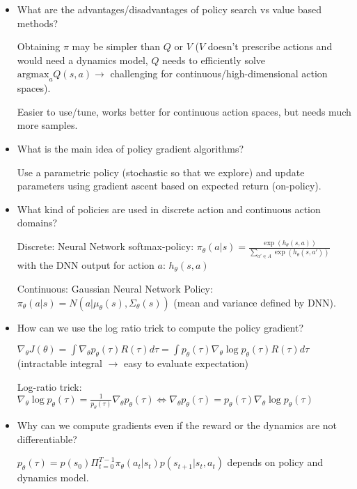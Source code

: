 \documentclass[11pt]{scrartcl}
\begin{document}
\begin{itemize}
    \item What are the advantages/disadvantages of policy search vs value based methods?

    Obtaining $\pi$ may be simpler than $Q$ or $V$ ($V$ doesn't prescribe actions and would 
    need a dynamics model, $Q$ needs to efficiently solve $\mathrm{argmax}_a Q(s,a) \rightarrow$
    challenging for continuous/high-dimensional action spaces).

    Easier to use/tune, works better for continuous action spaces, but needs much more samples.

    \item What is the main idea of policy gradient algorithms?
    
    Use a parametric policy (stochastic so that we explore) and update parameters using 
    gradient ascent based on expected return (on-policy).

    \item What kind of policies are used in discrete action and continuous action domains?
    
    Discrete: Neural Network softmax-policy: $\pi_\theta(a|s) = 
    \frac{\exp(h_\theta(s,a))}{\sum_{a' \in A} \exp(h_\theta(s,a'))}$ with the DNN output for 
    action $a$: $h_\theta(s,a)$

    Continuous: Gaussian Neural Network Policy: $\pi_\theta(a|s) = 
    N(a|\mu_\theta(s),\Sigma_\theta(s))$ (mean and variance defined by DNN).

    \item How can we use the log ratio trick to compute the policy gradient?
    
    $\nabla_\theta J(\theta) = \int \nabla_\theta p_\theta(\tau) R(\tau) d\tau = \int 
    p_\theta(\tau) \nabla_\theta \log p_\theta(\tau) R(\tau) d\tau$ 
    (intractable integral $\rightarrow$ easy to evaluate expectation)

    Log-ratio trick: $\nabla_\theta \log p_\theta(\tau) = \frac{1}{p_\theta(\tau)} \nabla_\theta p_\theta(\tau)
    \Leftrightarrow \nabla_\theta p_\theta(\tau) = p_\theta(\tau) \nabla_\theta \log p_\theta(\tau)$

    \item Why can we compute gradients even if the reward or the dynamics are not differentiable?

    $p_\theta(\tau) = p(s_0)\Pi_{t=0}^{T-1}\pi_\theta(a_t|s_t)p(s_{t+1}|s_t,a_t)$ depends on policy and
    dynamics model.


\end{itemize}
\end{document}

